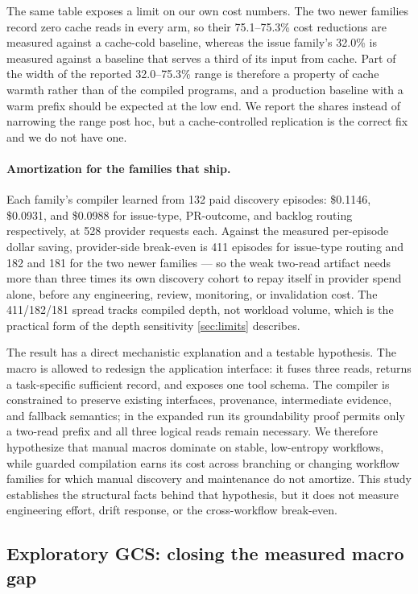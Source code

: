 The same table exposes a limit on our own cost numbers.  The two newer families record zero
cache reads in every arm, so their 75.1--75.3\% cost reductions are measured against a
cache-cold baseline, whereas the issue family's 32.0\% is measured against a baseline that
serves a third of its input from cache.  Part of the width of the reported 32.0--75.3\%
range is therefore a property of cache warmth rather than of the compiled programs, and a
production baseline with a warm prefix should be expected at the low end.  We report the
shares instead of narrowing the range post hoc, but a cache-controlled replication is the
correct fix and we do not have one.

\paragraph{Amortization for the families that ship.}
Each family's compiler learned from 132 paid discovery episodes: \$0.1146, \$0.0931, and
\$0.0988 for issue-type, PR-outcome, and backlog routing respectively, at 528 provider
requests each.  Against the measured per-episode dollar saving, provider-side break-even is
411 episodes for issue-type routing and 182 and 181 for the two newer families --- so the
weak two-read artifact needs more than three times its own discovery cohort to repay itself
in provider spend alone, before any engineering, review, monitoring, or invalidation cost.
The 411/182/181 spread tracks compiled depth, not workload volume, which is the practical
form of the depth sensitivity \cref{sec:limits} describes.

The result has a direct mechanistic explanation and a testable hypothesis.  The macro is
allowed to redesign the application interface: it fuses three reads, returns a
task-specific sufficient record, and exposes one tool schema.  The compiler is constrained
to preserve existing interfaces, provenance, intermediate evidence, and fallback
semantics; in the expanded run its groundability proof permits only a two-read prefix and
all three logical reads remain necessary.  We therefore hypothesize that manual macros
dominate on stable, low-entropy workflows, while guarded compilation earns its cost across
branching or changing workflow families for which manual discovery and maintenance do not
amortize.  This study establishes the structural facts behind that hypothesis, but it does
not measure engineering effort, drift response, or the cross-workflow break-even.

\subsection{Exploratory GCS: closing the measured macro gap}
\label{sec:gcs-results}

